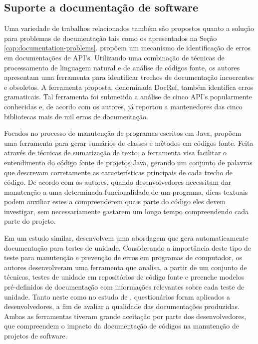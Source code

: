 \subsection{Suporte a documentação de software}
Uma variedade de trabalhos relacionados também são propostos quanto a solução para problemas de documentação tais como os apresentados na Seção \ref{cap:documentation-problems}. \citet{zhong2013detecting} propõem um mecanismo de identificação de erros em documentações de API's. Utilizando uma combinação de técnicas de processamento de linguagem natural e de análise de códigos fonte, os autores apresentam uma ferramenta para identificar trechos de documentação incoerentes e obsoletos. A ferramenta proposta, denominada DocRef, também identifica erros gramaticais. Tal ferramenta foi submetida a análise de cinco API's popularmente conhecidas e, de acordo com os autores, já reportou a mantenedores das cinco bibliotecas mais de mil erros de documentação.

Focados no processo de manutenção de programas escritos em Java, \citet{haiduc2010automated} propõem uma ferramenta para gerar sumários de classes e métodos em códigos fonte.  Feita através de técnicas de sumarização de texto, a ferramenta visa facilitar o entendimento do código fonte de projetos Java, gerando um conjunto de palavras que descrevam corretamente as características principais de cada trecho de código. De acordo com os autores, quando desenvolvedores necessitam dar manutenção a uma determinada funcionalidade de um programa, dicas textuais podem auxiliar estes a compreenderem quais parte do código eles devem investigar, sem necessariamente gastarem um longo tempo compreendendo cada parte do projeto. 

Em um estudo similar, \citet{li2016automatically} desenvolvem uma abordagem que gera automaticamente documentação para testes de unidade. Considerando a importância deste tipo de teste para manutenção e prevenção de erros em programas de computador, os autores desenvolveram uma ferramenta que analisa, a partir de um conjunto de técnicas, testes de unidade em repositórios de código fonte e preenche modelos pré-definidos de documentação com informações relevantes sobre cada teste de unidade. Tanto neste como no estudo de \citet{haiduc2010automated}, questionários foram aplicados a desenvolvedores, a fim de avaliar a qualidade das documentações produzidas. Ambas as ferramentas tiveram grande aceitação por parte dos desenvolvedores, que compreendem o impacto da documentação de códigos na manutenção de projetos de software.

